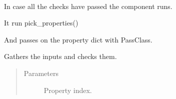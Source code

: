 \documentclass[letterpaper,10pt,english]{sphinxmanual}
\begin{document}
\begin{fulllineitems}
\begin{fulllineitems}
\end{fulllineitems}


\begin{fulllineitems}
\label{\detokenize{cmf:livestock.components.comp_cmf.CMFVegetationProperties.run}}~
\begin{DUlineblock}{0em}
\item[] In case all the checks have passed the component runs.
\item[] It run pick\_properties()
\item[] And passes on the property dict with PassClass.
\end{DUlineblock}

\end{fulllineitems}


\begin{fulllineitems}
\label{\detokenize{cmf:livestock.components.comp_cmf.CMFVegetationProperties.run_checks}}
Gathers the inputs and checks them.
\begin{quote}\begin{description}
\item[{Parameters}] \leavevmode
{} \textendash{} Property index.

\end{description}\end{quote}

\end{fulllineitems}


\end{fulllineitems}

\end{document}
